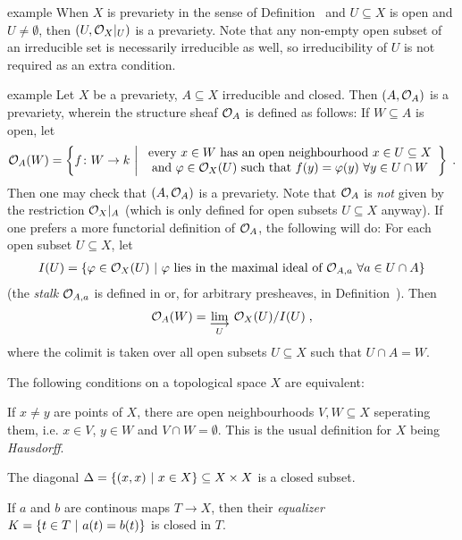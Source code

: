 \documentclass[a4paper,parskip=half,numbers=enddot, DIV=12]{scrreprt}
\begin{document}
\begin{varthm}{example}
 When $X$ is prevariety in the sense of Definition~ and $U\subseteq X$ is open and $U\neq \emptyset$, then $(U,\mathcal{O}_X|_U)$ is a prevariety. Note that any non-empty open subset of an irreducible set is necessarily irreducible as well, so irreducibility of $U$ is not required as an extra condition.
\end{varthm}
\begin{varthm}[b]{example}
 Let $X$ be a prevariety, $A\subseteq X$ irreducible and closed. Then $(A,\mathcal{O}_A)$ is a prevariety, wherein the structure sheaf $\mathcal{O}_A$ is defined as follows: If $W\subseteq A$ is open, let
 \begin{align*}
    \Oo_A(W) = \left\{ f\colon W\to k \st 
    \begin{array}{c}
	    \text{every } x\in W\text{ has an open neighbourhood } x\in U\subseteq X  \\
	    \text{and } \phi\in \Oo_X(U)\text{ such that } f(y) = \phi(y)\ \forall y\in U\cap W
    \end{array}\right\}\;.
 \end{align*}
 Then one may check that $(A,\mathcal{O}_A)$ is a prevariety. Note that $\mathcal{O}_A$ is \emph{not} given by the restriction $\mathcal{O}_X|_A$ (which is only defined for open subsets $U\subseteq X$ anyway). If one prefers a more functorial definition of $\mathcal{O}_A$, the following will do: For each open subset $U\subseteq X$, let 
 \begin{align*}
 	I(U)=\left\{\varphi\in\mathcal{O}_X(U)\ \middle|\  \varphi\text{ lies in the maximal ideal of }\mathcal{O}_{A,a}\ \forall a\in U\cap A\right\}
 \end{align*}
 (the \emph{stalk} $\mathcal{O}_{A,a}$ is defined in \cite[Definition 2.2.5]{alg1} or, for arbitrary presheaves, in Definition~). Then
 \begin{align*}
 	\Oo_A(W)=\colimit[U] \Oo_X(U)/I(U)\;,
 \end{align*}
	where the colimit is taken over all open subsets $U\subseteq X$ such that $U\cap A=W$.
\end{varthm}

\begin{rem*}
 The following conditions on a topological space $X$ are equivalent:
 \begin{alphanumerate}
  \item
    If $x\neq y$ are points of $X$, there are open neighbourhoods $V,W\subseteq X$ seperating them, i.e. $x\in V$, $y\in W$ and $V\cap W= \emptyset$. This is the usual definition for $X$ being \emph{Hausdorff}.
  \item
    The diagonal $\Delta = \left\{(x,x)\ \middle|\  x\in X\right\}\subseteq X\times X$ is a closed subset.
  \item 
    If $a$ and $b$ are continous maps $T\to X$, then their \emph{equalizer} $K = \left\{t\in T\ \middle|\  a(t) = b(t)\right\}$ is closed in $T$.
 \end{alphanumerate}

\end{rem*}
\end{document}
